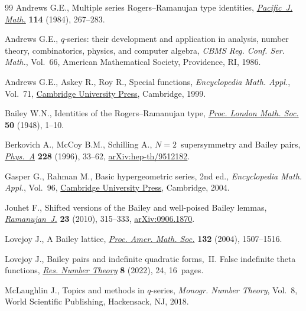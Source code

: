\documentclass[11pt]{article}
\numberwithin{equation}{section}
\begin{document}
\begin{thebibliography}{99}
Andrews G.E., Multiple series {R}ogers--{R}amanujan type identities,
 \href{https://doi.org/10.2140/pjm.1984.114.267}{\textit{Pacific~J. Math.}} \textbf{114} (1984), 267--283.

Andrews G.E., {$q$}-series: their development and application in analysis,
 number theory, combinatorics, physics, and computer algebra, \textit{CBMS
 Reg. Conf. Ser. Math.}, Vol.~66, American Mathematical Society, Providence,
 RI, 1986.

Andrews G.E., Askey R., Roy R., Special functions, \textit{Encyclopedia Math.
 Appl.}, Vol.~71, \href{https://doi.org/10.1017/CBO9781107325937}{Cambridge University Press}, Cambridge, 1999.

Bailey W.N., Identities of the {R}ogers--{R}amanujan type, \href{https://doi.org/10.1112/plms/s2-50.1.1}{\textit{Proc. London
 Math. Soc.}} \textbf{50} (1948), 1--10.

Berkovich A., McCoy B.M., Schilling A., {$N=2$}~supersymmetry and {B}ailey
 pairs, \href{https://doi.org/10.1016/S0378-4371(96)00054-4}{\textit{Phys.~A}} \textbf{228} (1996), 33--62, \href{https://arxiv.org/abs/hep-th/9512182}{arXiv:hep-th/9512182}.

Gasper G., Rahman M., Basic hypergeometric series, 2nd ed., \textit{Encyclopedia Math.
 Appl.}, Vol.~96, \href{https://doi.org/10.1017/CBO9780511526251}{Cambridge University Press}, Cambridge, 2004.

Jouhet F., Shifted versions of the {B}ailey and well-poised {B}ailey lemmas,
 \href{https://doi.org/10.1007/s11139-010-9282-x}{\textit{Ramanujan~J.}} \textbf{23} (2010), 315--333, \href{https://arxiv.org/abs/0906.1870}{arXiv:0906.1870}.

Lovejoy J., A {B}ailey lattice, \href{https://doi.org/10.1090/S0002-9939-03-07247-2}{\textit{Proc. Amer. Math. Soc.}} \textbf{132}
 (2004), 1507--1516.

Lovejoy J., Bailey pairs and indefinite quadratic forms,~{II}. {F}alse
 indefinite theta functions, \href{https://doi.org/10.1007/s40993-022-00324-x}{\textit{Res. Number Theory}} \textbf{8} (2022),
 24, 16~pages.

McLaughlin J., Topics and methods in {$q$}-series, \textit{Monogr. Number
 Theory}, Vol.~8, World Scientific Publishing, Hackensack, NJ, 2018.

\end{thebibliography}
\end{document}
